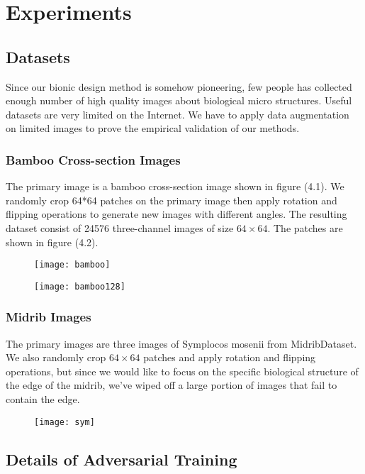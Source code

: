 \chapter{Experiments}

\section{Datasets}
Since our bionic design method is somehow pioneering, few people has collected enough number of high quality images about biological micro structures. Useful datasets are very limited on the Internet. We have to apply data augmentation on limited images to prove the empirical validation of our methods.

\subsection{Bamboo Cross-section Images}
The primary image is a bamboo cross-section image shown in figure (4.1). We randomly crop 64*64 patches on the primary image then apply rotation and flipping operations to generate new images with different angles. The resulting dataset consist of 24576 three-channel images of size $64\times64$. The patches are shown in figure (4.2).
\begin{figure}
	\centering
	\texttt{[image: bamboo]}
	\label{fig:10}
\end{figure}
\begin{figure}
	\centering
	\texttt{[image: bamboo128]}
	\label{fig:11}
\end{figure}
\subsection{Midrib Images}
The primary images are three images of Symplocos mosenii from MidribDataset. We also randomly crop $64\times64$ patches and apply rotation and flipping operations, but since we would like to focus on the specific biological structure of the edge of the midrib, we’ve wiped off a large portion of images that fail to contain the edge. 
\begin{figure}
	\centering
	\texttt{[image: sym]}
	\label{fig:12}
\end{figure}
\section{Details of Adversarial Training}

